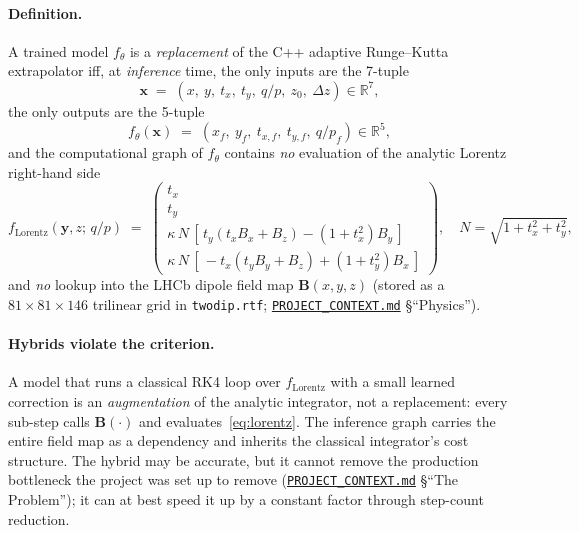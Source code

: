 \documentclass[11pt,a4paper]{article}
\newcommand{\qop}{q/p}
\newcommand{\dz}{\Delta z}
\newcommand{\state}{\mathbf{y}}
\newcommand{\Bfield}{\mathbf{B}}
\begin{document}
\paragraph{Definition.} A trained model $f_\theta$ is a \emph{replacement} of
the C++ adaptive Runge--Kutta extrapolator iff, at \emph{inference} time, the
only inputs are the 7-tuple
\begin{equation}\label{eq:input7}
\mathbf{x} \;=\; (x,\ y,\ t_x,\ t_y,\ \qop,\ z_0,\ \dz) \in \mathbb{R}^{7},
\end{equation}
the only outputs are the 5-tuple
\begin{equation}\label{eq:output5}
f_\theta(\mathbf{x}) \;=\; (x_f,\ y_f,\ t_{x,f},\ t_{y,f},\ {\qop}_f) \in \mathbb{R}^{5},
\end{equation}
and the computational graph of $f_\theta$ contains \emph{no} evaluation of the
analytic Lorentz right-hand side
\begin{equation}\label{eq:lorentz}
f_\mathrm{Lorentz}(\state, z;\, \qop) \;=\;
\begin{pmatrix}
t_x \\ t_y \\
\kappa\, N\,[\, t_y(t_x B_x + B_z) - (1 + t_x^2) B_y \,] \\
\kappa\, N\,[\, -t_x(t_y B_y + B_z) + (1 + t_y^2) B_x \,]
\end{pmatrix},
\quad N = \sqrt{1 + t_x^2 + t_y^2},
\end{equation}
and \emph{no} lookup into the LHCb dipole field map $\Bfield(x, y, z)$
(stored as a $81\times 81\times 146$ trilinear grid in
\texttt{twodip.rtf};
\href{run:../../PROJECT_CONTEXT.md}{\texttt{PROJECT\_CONTEXT.md}} §``Physics'').

\paragraph{Hybrids violate the criterion.} A model that runs a classical
RK4 loop over $f_\mathrm{Lorentz}$ with a small learned correction is an
\emph{augmentation} of the analytic integrator, not a replacement: every
sub-step calls $\Bfield(\cdot)$ and evaluates~\eqref{eq:lorentz}. The
inference graph carries the entire field map as a dependency and inherits the
classical integrator's cost structure. The hybrid may be accurate, but it
cannot remove the production bottleneck the project was set up to remove
(\href{run:../../PROJECT_CONTEXT.md}{\texttt{PROJECT\_CONTEXT.md}}
§``The Problem''); it can at best speed it up by a constant factor through
step-count reduction.
\end{document}
